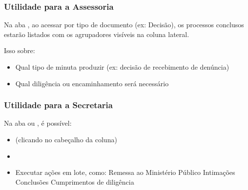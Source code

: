 \documentclass[letterpaper,10pt,brazil]{sphinxmanual}
\begin{document}
\subsubsection{Utilidade para a Assessoria}
\label{\detokenize{projud_51_agrupador:utilidade-para-a-assessoria}}
\sphinxAtStartPar
Na aba , ao acessar por tipo de documento (ex: Decisão), os processos conclusos estarão listados com os agrupadores visíveis na coluna lateral.

\sphinxAtStartPar
Isso  sobre:
\begin{itemize}
\item {} 
\sphinxAtStartPar
Qual tipo de minuta produzir (ex: decisão de recebimento de denúncia)

\item {} 
\sphinxAtStartPar
Qual diligência ou encaminhamento será necessário

\end{itemize}


\subsubsection{Utilidade para a Secretaria}
\label{\detokenize{projud_51_agrupador:utilidade-para-a-secretaria}}
\sphinxAtStartPar
Na aba  ou , é possível:
\begin{itemize}
\item {} 
\sphinxAtStartPar
{} (clicando no cabeçalho da coluna)

\item {} 
\sphinxAtStartPar
{}

\item {} 
\sphinxAtStartPar
Executar ações em lote, como:
\sphinxhyphen{} Remessa ao Ministério Público
\sphinxhyphen{} Intimações
\sphinxhyphen{} Conclusões
\sphinxhyphen{} Cumprimentos de diligência

\end{itemize}
\end{document}
